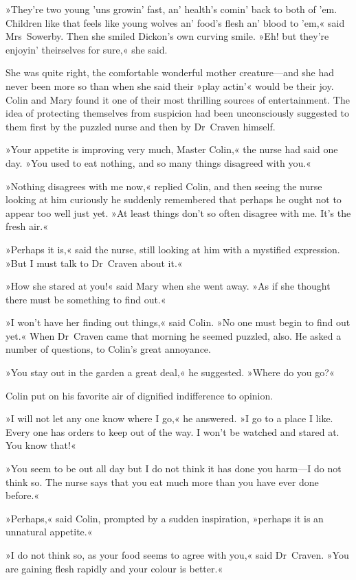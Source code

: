 »They're two young 'uns growin' fast, an' health's comin' back to both of 'em. Children like that feels like young wolves an' food's flesh an' blood to 'em,« said Mrs~Sowerby. Then she smiled Dickon's own curving smile. »Eh! but they're enjoyin' theirselves for sure,« she said.

She was quite right, the comfortable wonderful mother creature—and she had never been more so than when she said their »play actin'« would be their joy. Colin and Mary found it one of their most thrilling sources of entertainment. The idea of protecting themselves from suspicion had been unconsciously suggested to them first by the puzzled nurse and then by Dr~Craven himself.

»Your appetite is improving very much, Master Colin,« the nurse had said one day. »You used to eat nothing, and so many things disagreed with you.«

»Nothing disagrees with me now,« replied Colin, and then seeing the nurse looking at him curiously he suddenly remembered that perhaps he ought not to appear too well just yet. »At least things don't so often disagree with me. It's the fresh air.«

»Perhaps it is,« said the nurse, still looking at him with a mystified expression. »But I must talk to Dr~Craven about it.«

»How she stared at you!« said Mary when she went away. »As if she thought there must be something to find out.«

»I won't have her finding out things,« said Colin. »No one must begin to find out yet.« When Dr~Craven came that morning he seemed puzzled, also. He asked a number of questions, to Colin's great annoyance.

»You stay out in the garden a great deal,« he suggested. »Where do you go?«

Colin put on his favorite air of dignified indifference to opinion.

»I will not let any one know where I go,« he answered. »I go to a place I like. Every one has orders to keep out of the way. I won't be watched and stared at. You know that!«

»You seem to be out all day but I do not think it has done you harm—I do not think so. The nurse says that you eat much more than you have ever done before.«

»Perhaps,« said Colin, prompted by a sudden inspiration, »perhaps it is an unnatural appetite.«

»I do not think so, as your food seems to agree with you,« said Dr~Craven. »You are gaining flesh rapidly and your colour is better.«

